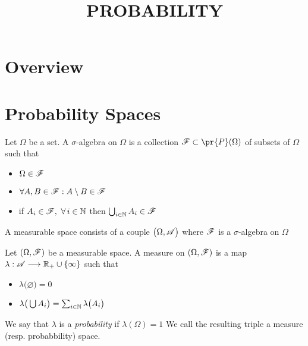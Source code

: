 


\title{PROBABILITY}

\maketitle	


\noindent\hrulefill
\tableofcontents
\noindent\hrulefill

\label{section-phantom}



\section{Overview}



\section{Probability Spaces}
\label{section:measurable_spaces}

\begin{definition}
\label{definition:measurable_space}
Let $\Omega$ be a set. A $\sigma$-algebra on $\Omega$ is a collection $\r{F}\subset \pr{P}(\Omega)$ of subsets of $\Omega$ such that
\begin{itemize}
\item $\Omega \in \r{F}$
\item $\forall A, B \in\r{F}: A\setminus B \in\r{F}$
\item if $A_i\in\r{F},\,\,\forall \,i \in \d{N}$ then $\bigcup_{i \in \d{N}} A_i \in \r{F}$
\end{itemize}
A measurable space consists of a couple $\big(\Omega,\r{A}\big)$ where $\r{F}$ is a $\sigma$-algebra on $\Omega$
\end{definition}

\begin{definition}
\label{definition:probability_space}
Let $(\Omega,\r{F})$ be a measurable space. A measure on $(\Omega,\r{F})$ is a map $\lambda:\r{A}\mor \d{R}_+ \cup \{\infty\}$ such that 
\begin{itemize}
\item $\lambda\big(\varnothing) = 0$
\item $\lambda\big(\bigcup A_i\big) = \sum_{i \in \mathbb{N}} \lambda\big(A_i\big)$
\end{itemize}
We say that $\lambda$ is a \emph{probability} if $\lambda(\Omega)=1$
We call the resulting triple a measure (resp. probabbility) space.
\end{definition}


